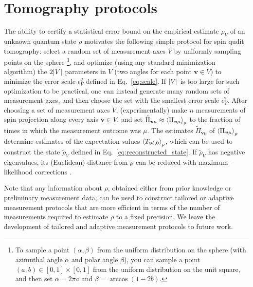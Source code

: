 \documentclass[notitlepage,twocolumn]{revtex4-2}
\newcommand{\p}[1]{\left(#1\right)} %
\newcommand{\bk}{\Braket} %
\renewcommand{\v}{\bm} %
\begin{document}
\section{Tomography protocols}
\label{sec:protocol}

The ability to certify a statistical error bound on the empirical estimate $\tilde\rho_V$ of an unknown quantum state $\rho$ motivates the following simple protocol for spin qudit tomography: select a random set of measurement axes $V$ by uniformly sampling points on the sphere \footnote{To sample a point $\p{\alpha,\beta}$ from the uniform distribution on the sphere (with azimuthal angle $\alpha$ and polar angle $\beta$), you can sample a point $\p{a,b}\in[0,1]\times[0,1]$ from the uniform distribution on the unit square, and then set $\alpha=2\pi a$ and $\beta=\arccos\p{1-2b}$.}, and optimize (using any standard minimization algorithm) the $2\abs{V}$ parameters in $V$ (two angles for each point $\v v\in V$) to minimize the error scale $\epsilon_V^2$ defined in Eq.~\eqref{eq:scale}.
If $\abs{V}$ is too large for such optimization  to be practical, one can instead generate many random sets of measurement axes, and then choose the set with the smallest error scale $\epsilon_V^2$.
After choosing a set of measurement axes $V$, (experimentally) make $n$ measurements of spin projection along every axis $\v v\in V$, and set $\tilde\Pi_{\v v\mu}\approx\bk{\Pi_{\v v\mu}}_\rho$ to the fraction of times in which the measurement outcome was $\mu$.
The estimates $\tilde\Pi_{\v v\mu}$ of $\bk{\Pi_{\v v\mu}}_\rho$ determine estimates of the expectation values $\bk{T_{\v v\ell,0}}_\rho$, which can be used to construct the state $\tilde\rho_V$ defined in Eq.~\eqref{eq:reconstructed_state}.
If $\tilde\rho_V$ has negative eigenvalues, its (Euclidean) distance from $\rho$ can be reduced with maximum-likelihood corrections \cite{smolin2012efficient}.

Note that any information about $\rho$, obtained either from prior knowledge or preliminary measurement data, can be used to construct tailored or adaptive measurement protocols \cite{pereira2018adaptive} that are more efficient in terms of the number of measurements required to estimate $\rho$ to a fixed precision.
We leave the development of tailored and adaptive measurement protocols to future work.
\end{document}
